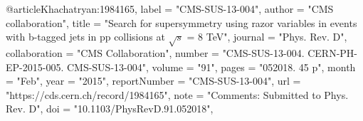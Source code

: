 @article{Khachatryan:1984165,
      label          = "CMS-SUS-13-004",
      author        = "{CMS collaboration}",
      title         = "{Search for supersymmetry using razor variables in events
                       with b-tagged jets in pp collisions at $\sqrt{s}$ = 8 TeV}",
      journal       = "Phys. Rev. D",
      collaboration = "CMS Collaboration",
      number        = "CMS-SUS-13-004. CERN-PH-EP-2015-005. CMS-SUS-13-004",
      volume        = "91",
      pages         = "052018. 45 p",
      month         = "Feb",
      year          = "2015",
      reportNumber  = "CMS-SUS-13-004",
      url           = "https://cds.cern.ch/record/1984165",
      note          = "Comments: Submitted to Phys. Rev. D",
      doi           = "10.1103/PhysRevD.91.052018",
}

